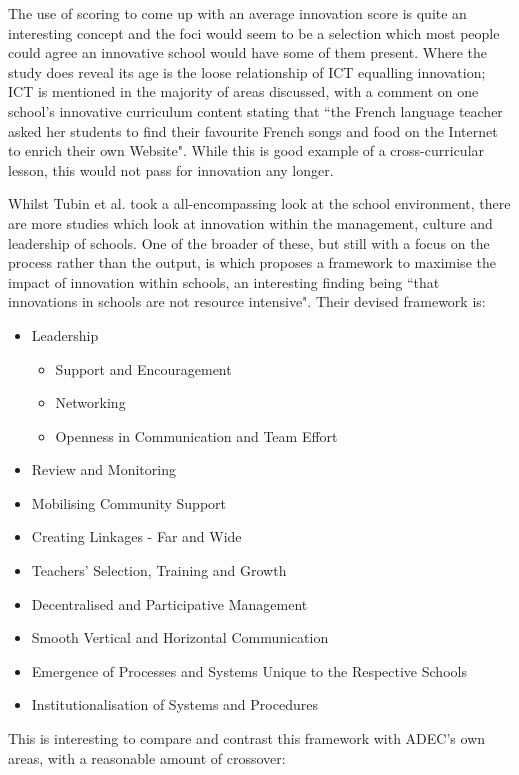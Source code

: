 \documentclass[11pt]{article}
\begin{document}
The use of scoring to come up with an average innovation score is quite an interesting concept and the foci would seem to be a selection which most people could agree an innovative school would have some of them present. Where the study does reveal its age is the loose relationship of ICT equalling innovation; ICT is mentioned in the majority of areas discussed, with a comment on one school's innovative curriculum content stating that ``the French language teacher asked her students to find their favourite French songs and food on the Internet to enrich their own Website". While this is good example of a cross-curricular lesson, this would not pass for innovation any longer.

Whilst Tubin et al. took a all-encompassing look at the school environment, there are more studies which look at innovation within the management, culture and leadership of schools. One of the broader of these, but still with a focus on the process rather than the output, is \citet{Sharma_2005} which proposes a framework to maximise the impact of innovation within schools, an interesting finding being ``that innovations in schools are not resource intensive". Their devised framework is:

\begin{itemize}
	\item Leadership
	\begin{itemize}
		\item Support and Encouragement
		\item Networking
		\item Openness in Communication and Team Effort
	\end{itemize}
	\item Review and Monitoring
	\item Mobilising Community Support
	\item Creating Linkages - Far and Wide
	\item Teachers' Selection, Training and Growth
	\item Decentralised and Participative Management
	\item Smooth Vertical and Horizontal Communication
	\item Emergence of Processes and Systems Unique to the Respective Schools
	\item Institutionalisation of Systems and Procedures
\end{itemize}

This is interesting to compare and contrast this framework with ADEC's own areas, with a reasonable amount of crossover:
\end{document}
